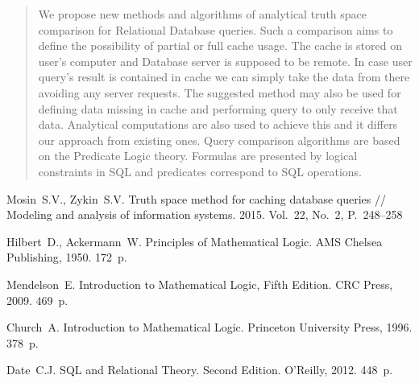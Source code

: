 \documentclass{cmi}
\begin{document}
\begin{abstract}%
We propose new methods and algorithms of analytical truth space comparison for Relational Database queries.
Such a comparison aims to define the possibility of partial or full cache usage. The cache is stored on
user's computer and Database server is supposed to be remote. In case user query's result is contained in
cache we can simply take the data from there avoiding any server requests. The suggested method may also be
used for defining data missing in cache and performing query to only receive that data. Analytical
computations are also used to achieve this and it differs our approach from existing ones. Query comparison
algorithms are based on the Predicate Logic theory. Formulas are presented by logical constraints in SQL
and predicates correspond to SQL operations.

\end{abstract}

\begin{biblio_lat}
Mosin~S.V., Zykin~S.V. Truth space method for caching database queries // Modeling and analysis of information
systems. 2015. Vol.~22, No.~2, P.~248--258

Hilbert~D., Ackermann~W. Principles of Mathematical Logic. AMS Chelsea Publishing, 1950. 172~p.

Mendelson~E. Introduction to Mathematical Logic, Fifth Edition. CRC Press, 2009. 469~p.

Church~A. Introduction to Mathematical Logic. Princeton University Press, 1996. 378~p.

Date~C.J. SQL and Relational Theory. Second Edition. O'Reilly, 2012. 448~p.
\end{biblio_lat}

\end{document}
